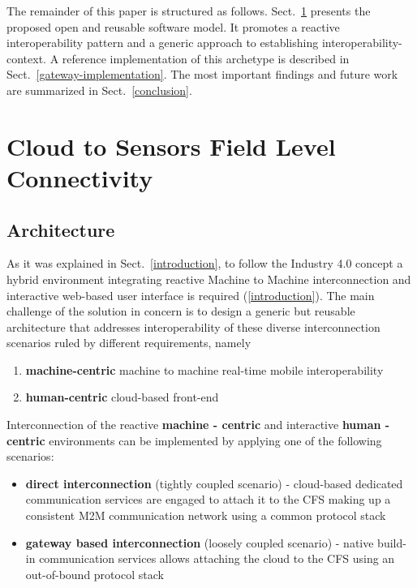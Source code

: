 \documentclass{jacsart}
\begin{document}
The remainder of this paper is structured as follows. Sect.~\ref*{cloud-to-sensors-field-level-connectivity} presents the proposed open and reusable software model. It promotes a reactive interoperability pattern and a generic approach to establishing interoperability-context. A reference implementation of this archetype is described in Sect.~\ref*{gateway-implementation}. The most important findings and future work are summarized in Sect.~\ref*{conclusion}.

\section{Cloud to Sensors Field Level Connectivity}\label{cloud-to-sensors-field-level-connectivity}

\subsection{Architecture}\label{architecture}

As it was explained in Sect.~\ref*{introduction}, to follow the Industry 4.0 concept a hybrid environment integrating reactive Machine to Machine interconnection and interactive web-based user interface is required (\ref*{introduction}). The main challenge of the solution in concern is to design a generic but reusable architecture that addresses interoperability of these diverse interconnection scenarios ruled by different requirements, namely

\begin{enumerate}
      \item \textbf{machine-centric} machine to machine real-time mobile interoperability
      \item \textbf{human-centric} cloud-based front-end
\end{enumerate}

Interconnection of the reactive \textbf{machine - centric} and interactive \textbf{human - centric} environments can be implemented by applying one of the following scenarios:

\begin{itemize}
      \item \textbf{direct interconnection} (tightly coupled scenario) - cloud-based dedicated communication services are engaged to attach it to the CFS making up a consistent M2M communication network using a common protocol stack
      \item \textbf{gateway based interconnection} (loosely coupled scenario) - native build-in communication services allows attaching the cloud to the CFS using an out-of-bound protocol stack
\end{itemize}
\end{document}
